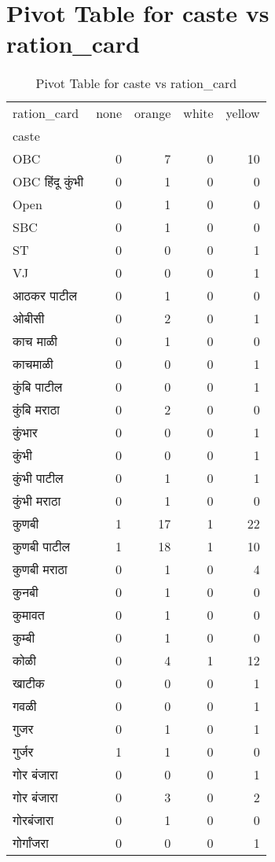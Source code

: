 \documentclass{article}
\begin{document}
\section{Pivot Table for caste vs ration_card}
\begin{table}
\caption{Pivot Table for caste vs ration_card}
\label{tab:caste_ration_card}
\begin{tabular}{lrrrr}
\toprule
ration_card & none & orange & white & yellow \\
caste &  &  &  &  \\
\midrule
OBC & 0 & 7 & 0 & 10 \\
OBC हिंदू कुंभी & 0 & 1 & 0 & 0 \\
Open & 0 & 1 & 0 & 0 \\
SBC & 0 & 1 & 0 & 0 \\
ST & 0 & 0 & 0 & 1 \\
VJ & 0 & 0 & 0 & 1 \\
आठकर पाटील & 0 & 1 & 0 & 0 \\
ओबीसी & 0 & 2 & 0 & 1 \\
काच माळी & 0 & 1 & 0 & 0 \\
काचमाळी & 0 & 0 & 0 & 1 \\
कुंबि पाटील & 0 & 0 & 0 & 1 \\
कुंबि मराठा & 0 & 2 & 0 & 0 \\
कुंभार & 0 & 0 & 0 & 1 \\
कुंभी & 0 & 0 & 0 & 1 \\
कुंभी पाटील & 0 & 1 & 0 & 1 \\
कुंभी मराठा & 0 & 1 & 0 & 0 \\
कुणबी & 1 & 17 & 1 & 22 \\
कुणबी पाटील & 1 & 18 & 1 & 10 \\
कुणबी मराठा & 0 & 1 & 0 & 4 \\
कुनबी & 0 & 1 & 0 & 0 \\
कुमावत & 0 & 1 & 0 & 0 \\
कुम्बी & 0 & 1 & 0 & 0 \\
कोळी & 0 & 4 & 1 & 12 \\
खाटीक & 0 & 0 & 0 & 1 \\
गवळी & 0 & 0 & 0 & 1 \\
गुजर & 0 & 1 & 0 & 1 \\
गुर्जर & 1 & 1 & 0 & 0 \\
गोर  बंजारा & 0 & 0 & 0 & 1 \\
गोर बंजारा & 0 & 3 & 0 & 2 \\
गोरबंजारा & 0 & 1 & 0 & 0 \\
गोर्गांजरा & 0 & 0 & 0 & 1 \\

\end{tabular}
\end{table}
\end{document}
